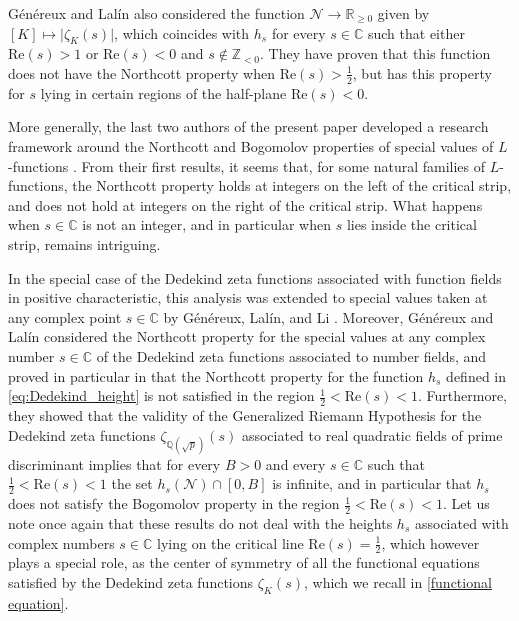 \documentclass[10pt,a4paper]{amsart}
\theoremstyle{plain}
\theoremstyle{definition}
\theoremstyle{remark}
\begin{document}
    Généreux and Lalín \cite{GeLa24} also considered the function $\mathcal{N} \to \mathbb{R}_{\geq 0}$ given by $[K] \mapsto \lvert \zeta_K(s) \rvert$, which coincides with $h_s$ for every $s \in \mathbb{C}$ such that either $\mathrm{Re}(s) > 1$ or $\mathrm{Re}(s) < 0$ and $s \not\in \mathbb{Z}_{< 0}$.
    They have proven that this function does not have the Northcott property when $\mathrm{Re}(s) > \frac{1}{2}$, but has this property for $s$ lying in certain regions of the half-plane $\mathrm{Re}(s) < 0$.

More generally, the last two authors of the present paper developed a research framework around the Northcott and Bogomolov properties of special values of $L$-functions \cite{Pazuki_Pengo_2024}. From their first results, it seems that, for some natural families of $L$-functions, the Northcott property holds at integers on the left of the critical strip, and does not hold at integers on the right of the critical strip. What happens when $s \in \mathbb{C}$ is not an integer, and in particular when $s$ lies inside the critical strip, remains intriguing. 

In the special case of the Dedekind zeta functions associated with function fields in positive characteristic, this analysis was extended to special values taken at any complex point $s \in \mathbb{C}$ by Généreux, Lalín, and Li \cite{GeLaLi22}. Moreover, G\'en\'ereux and Lalín \cite{GeLa24} considered the Northcott property for the special values at any complex number $s \in \mathbb{C}$ of the Dedekind zeta functions associated to number fields, and proved in particular in \cite[Theorem~1.6]{GeLa24} that the Northcott property for the function $h_s$ defined in \eqref{eq:Dedekind_height} is not satisfied in the region $\frac{1}{2}<\mathrm{Re}(s)<1$. Furthermore, they showed that the validity of the Generalized Riemann Hypothesis for the Dedekind zeta functions $\zeta_{\mathbb{Q}(\sqrt{p})}(s)$ associated to real quadratic fields of prime discriminant implies that for every $B > 0$ and every $s \in \mathbb{C}$ such that $\frac{1}{2} < \mathrm{Re}(s) < 1$ the set $h_s(\mathcal{N}) \cap [0,B]$ is infinite, and in particular that $h_s$ does not satisfy the Bogomolov property in the region $\frac{1}{2} < \mathrm{Re}(s) < 1$. Let us note once again that these results do not deal with the heights $h_s$ associated with complex numbers $s \in \mathbb{C}$ lying on the critical line $\mathrm{Re}(s)=\frac{1}{2}$, which however plays a special role, as the center of symmetry of all the functional equations satisfied by the Dedekind zeta functions $\zeta_K(s)$, which we recall in \eqref{functional equation}. 
\end{document}

